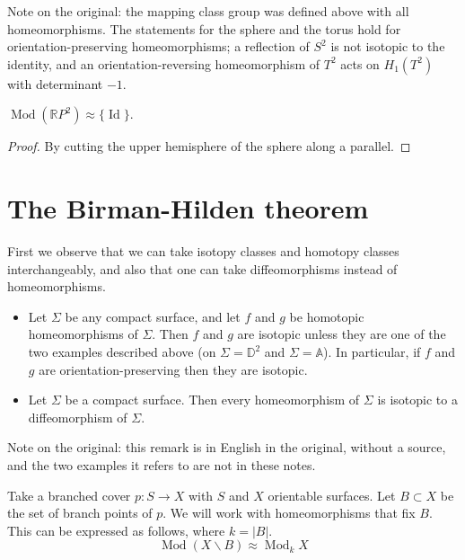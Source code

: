 Note on the original: the mapping class
group was defined above with all
homeomorphisms. The statements for the
sphere and the torus hold for
orientation-preserving homeomorphisms; a
reflection of $S^2$ is not isotopic to
the identity, and an
orientation-reversing homeomorphism of
$T^2$ acts on $H_1(T^2)$ with
determinant $-1$.

\begin{example}
\label{example-mod-projective-plane}
$\operatorname{Mod}(\mathbb{R}P^2)
\approx\{\operatorname{Id}\}$.
\end{example}

\begin{proof}
By cutting the upper hemisphere of the
sphere along a parallel.
\end{proof}

\section{The Birman-Hilden theorem}
\label{section-birman-hilden-theorem}

\noindent
First we observe that we can take
isotopy classes and homotopy classes
interchangeably, and also that one can
take diffeomorphisms instead of
homeomorphisms.

\begin{remark}
\label{remark-homotopy-isotopy}
\begin{itemize}
\item Let $\Sigma$ be any compact
surface, and let $f$ and $g$ be
homotopic homeomorphisms of $\Sigma$.
Then $f$ and $g$ are isotopic unless
they are one of the two examples
described above (on
$\Sigma=\mathbb{D}^2$ and
$\Sigma=\mathbb{A}$). In particular, if
$f$ and $g$ are orientation-preserving
then they are isotopic.
\item Let $\Sigma$ be a compact surface.
Then every homeomorphism of $\Sigma$ is
isotopic to a diffeomorphism of
$\Sigma$.
\end{itemize}
Note on the original: this remark is in
English in the original, without a
source, and the two examples it refers
to are not in these notes.
\end{remark}

Take a branched cover $p:S\to X$ with
$S$ and $X$ orientable surfaces. Let
$B\subset X$ be the set of branch points
of $p$. We will work with homeomorphisms
that fix $B$. This can be expressed as
follows, where $k=|B|$.
$$
\operatorname{Mod}(X\backslash B)
\approx\operatorname{Mod}_{k}X
$$

